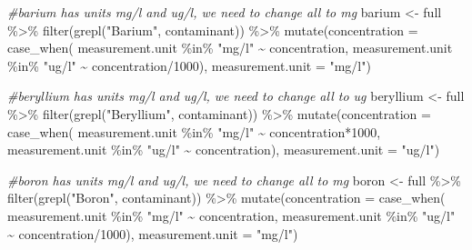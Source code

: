 \documentclass[12pt, twoside]{amherstthesis}
\newenvironment{Shaded}{\begin{snugshade}}{\end{snugshade}}
\newcommand{\AttributeTok}[1]{\textcolor[rgb]{0.77,0.63,0.00}{#1}}
\newcommand{\CommentTok}[1]{\textcolor[rgb]{0.56,0.35,0.01}{\textit{#1}}}
\newcommand{\DecValTok}[1]{\textcolor[rgb]{0.00,0.00,0.81}{#1}}
\newcommand{\FunctionTok}[1]{\textcolor[rgb]{0.00,0.00,0.00}{#1}}
\newcommand{\NormalTok}[1]{#1}
\newcommand{\OtherTok}[1]{\textcolor[rgb]{0.56,0.35,0.01}{#1}}
\newcommand{\SpecialCharTok}[1]{\textcolor[rgb]{0.00,0.00,0.00}{#1}}
\newcommand{\StringTok}[1]{\textcolor[rgb]{0.31,0.60,0.02}{#1}}
\begin{document}
\begin{Shaded}
\begin{Highlighting}[]
\CommentTok{\#barium has units  mg/l and ug/l, we need to change all to mg}
\NormalTok{barium }\OtherTok{\textless{}{-}}\NormalTok{ full }\SpecialCharTok{\%\textgreater{}\%}
  \FunctionTok{filter}\NormalTok{(}\FunctionTok{grepl}\NormalTok{(}\StringTok{"Barium"}\NormalTok{, contaminant)) }\SpecialCharTok{\%\textgreater{}\%}
  \FunctionTok{mutate}\NormalTok{(}\AttributeTok{concentration =} 
           \FunctionTok{case\_when}\NormalTok{(}
\NormalTok{             measurement.unit }\SpecialCharTok{\%in\%} \StringTok{"mg/l"} \SpecialCharTok{\textasciitilde{}}\NormalTok{ concentration,}
\NormalTok{             measurement.unit }\SpecialCharTok{\%in\%} \StringTok{"ug/l"} \SpecialCharTok{\textasciitilde{}}\NormalTok{ concentration}\SpecialCharTok{/}\DecValTok{1000}\NormalTok{),}
         \AttributeTok{measurement.unit =} \StringTok{"mg/l"}\NormalTok{)}

\CommentTok{\#beryllium has units mg/l and ug/l, we need to change all to ug}
\NormalTok{beryllium }\OtherTok{\textless{}{-}}\NormalTok{ full }\SpecialCharTok{\%\textgreater{}\%}
  \FunctionTok{filter}\NormalTok{(}\FunctionTok{grepl}\NormalTok{(}\StringTok{"Beryllium"}\NormalTok{, contaminant)) }\SpecialCharTok{\%\textgreater{}\%}
  \FunctionTok{mutate}\NormalTok{(}\AttributeTok{concentration =} 
           \FunctionTok{case\_when}\NormalTok{(}
\NormalTok{             measurement.unit }\SpecialCharTok{\%in\%} \StringTok{"mg/l"} \SpecialCharTok{\textasciitilde{}}\NormalTok{ concentration}\SpecialCharTok{*}\DecValTok{1000}\NormalTok{,}
\NormalTok{             measurement.unit }\SpecialCharTok{\%in\%} \StringTok{"ug/l"} \SpecialCharTok{\textasciitilde{}}\NormalTok{ concentration),}
         \AttributeTok{measurement.unit =} \StringTok{"ug/l"}\NormalTok{)}

\CommentTok{\#boron has units mg/l and ug/l, we need to change all to mg}
\NormalTok{boron }\OtherTok{\textless{}{-}}\NormalTok{ full }\SpecialCharTok{\%\textgreater{}\%}
  \FunctionTok{filter}\NormalTok{(}\FunctionTok{grepl}\NormalTok{(}\StringTok{"Boron"}\NormalTok{, contaminant)) }\SpecialCharTok{\%\textgreater{}\%}
  \FunctionTok{mutate}\NormalTok{(}\AttributeTok{concentration =} 
           \FunctionTok{case\_when}\NormalTok{(}
\NormalTok{             measurement.unit }\SpecialCharTok{\%in\%} \StringTok{"mg/l"} \SpecialCharTok{\textasciitilde{}}\NormalTok{ concentration,}
\NormalTok{             measurement.unit }\SpecialCharTok{\%in\%} \StringTok{"ug/l"} \SpecialCharTok{\textasciitilde{}}\NormalTok{ concentration}\SpecialCharTok{/}\DecValTok{1000}\NormalTok{),}
         \AttributeTok{measurement.unit =} \StringTok{"mg/l"}\NormalTok{)}


\end{Highlighting}
\end{Shaded}
\end{document}
